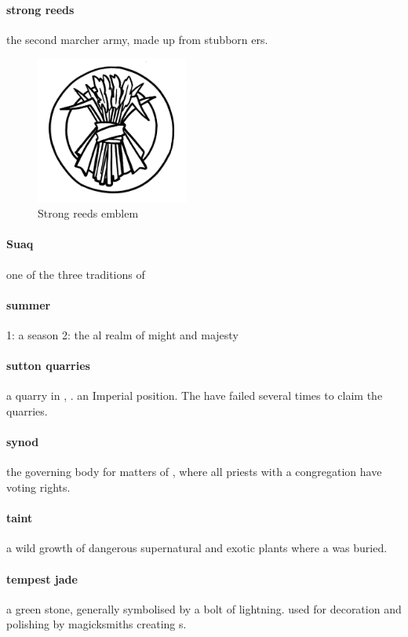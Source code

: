 \paragraph{strong reeds} the second marcher army, made up from stubborn ers.\begin{figure}\centering\includegraphics[width=5cm]{encyclopedia/StrongReeds}\caption{Strong reeds emblem}\end{figure}
\paragraph{Suaq} one of the three traditions of 
\paragraph{summer} 1: a season 2: the al realm of might and majesty
\paragraph{sutton quarries} a  quarry in , . an Imperial  position. The  have failed several times to claim the quarries.
\paragraph{synod} the governing body for matters of , where all priests with a congregation have voting rights.
\paragraph{taint} a wild growth of dangerous supernatural and exotic plants where a  was buried.
\paragraph{tempest jade} a green stone, generally symbolised by a bolt of lightning. used for decoration and polishing by magicksmiths creating s. 
